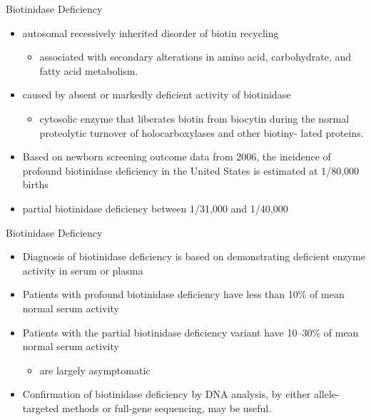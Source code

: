 \documentclass[presentation, smaller]{beamer}
\begin{document}
\begin{frame}[label={sec:orgheadline1}]{Biotinidase Deficiency}
\begin{itemize}
\item autosomal recessively inherited disorder of biotin recycling
\begin{itemize}
\item associated with secondary alterations in amino acid, carbohydrate,
and fatty acid metabolism.
\end{itemize}
\item caused by absent or markedly deficient activity of biotinidase
\begin{itemize}
\item cytosolic enzyme that liberates biotin from biocytin during the
normal proteolytic turnover of holocarboxylases and other biotiny-
lated proteins.
\end{itemize}

\item Based on newborn screening outcome data from 2006, the incidence of
profound biotinidase deficiency in the United States is estimated at
1/80,000 births
\item partial biotinidase deficiency between 1/31,000 and 1/40,000
\end{itemize}
\end{frame}

\begin{frame}[label={sec:orgheadline2}]{Biotinidase Deficiency}
\begin{itemize}
\item Diagnosis of biotinidase deficiency is based on demonstrating
deficient enzyme activity in serum or plasma

\item Patients with profound biotinidase deficiency have less than 10\% of
mean normal serum activity

\item Patients with the partial biotinidase deficiency variant have 10–30\%
of mean normal serum activity
\begin{itemize}
\item are largely asymptomatic
\end{itemize}

\item Confirmation of biotinidase deficiency by DNA analysis, by either
allele-targeted methods or full-gene sequencing, may be useful.
\end{itemize}
\end{frame}
\end{document}
